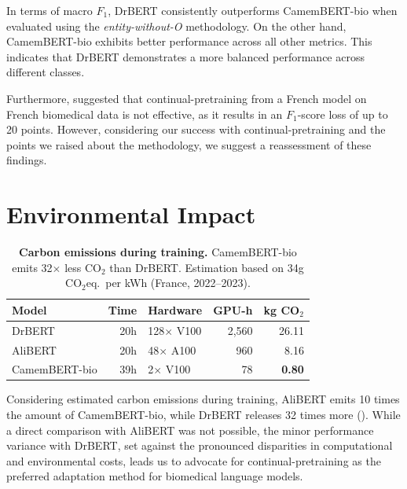 \begin{reviewread}
In terms of macro $F_1$, DrBERT consistently outperforms CamemBERT-bio when evaluated using the \textit{entity-without-O} methodology. On the other hand, CamemBERT-bio exhibits better performance across all other metrics. This indicates that DrBERT demonstrates a more balanced performance across different classes.
\end{reviewread}

\begin{reviewread}
Furthermore, \citet{labrak2023drbert} suggested that continual-pretraining from a French model on French biomedical data is not effective, as it results in an $F_1$-score loss of up to 20 points. However, considering our success with continual-pretraining and the points we raised about the methodology, we suggest a reassessment of these findings.
\end{reviewread}


\section{Environmental Impact}

\begin{table}[t]
\centering
\small
\begin{tabular}{l r l r r}
\toprule
\textbf{Model} & \textbf{Time} & \textbf{Hardware} & \textbf{GPU-h} & \textbf{kg CO$_2$} \\
\midrule
DrBERT & 20h & 128$\times$ V100 & 2,560 & 26.11 \\
AliBERT~\citep{berhe:hal-03911564} & 20h & 48$\times$ A100 & 960 & 8.16 \\
CamemBERT-bio & 39h & 2$\times$ V100 & 78 & \bfseries 0.80 \\
\bottomrule
\end{tabular}
\caption{\textbf{Carbon emissions during training.} CamemBERT-bio emits 32$\times$ less CO$_2$ than DrBERT. Estimation based on 34g CO$_2$eq.\ per kWh (France, 2022--2023).}
\label{tab:carbon}
\end{table}

\begin{reviewread}
Considering estimated carbon emissions during training, AliBERT emits 10 times the amount of CamemBERT-bio, while DrBERT releases 32 times more (). While a direct comparison with AliBERT was not possible, the minor performance variance with DrBERT, set against the pronounced disparities in computational and environmental costs, leads us to advocate for continual-pretraining as the preferred adaptation method for biomedical language models.
\end{reviewread}


